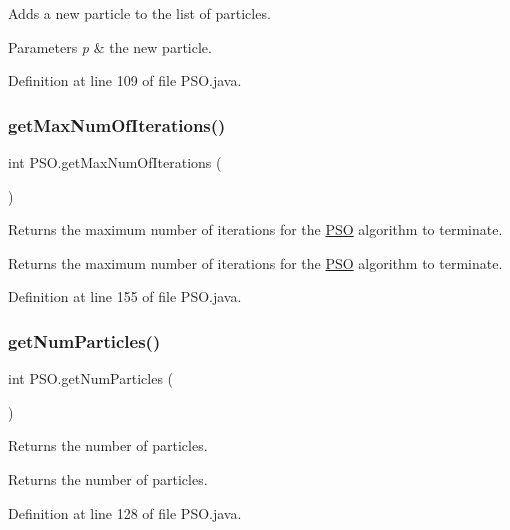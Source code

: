 Adds a new particle to the list of particles. 
\begin{DoxyParams}{Parameters}
{\em p} & the new particle. \\
\hline
\end{DoxyParams}


Definition at line 109 of file P\+S\+O.\+java.

\mbox{\label{class_p_s_o_a0d3cd48e829ba5ccb754e26f1890e51b}} 
\subsubsection{\texorpdfstring{get\+Max\+Num\+Of\+Iterations()}{getMaxNumOfIterations()}}
{\footnotesize\ttfamily int P\+S\+O.\+get\+Max\+Num\+Of\+Iterations (\begin{DoxyParamCaption}{ }\end{DoxyParamCaption})}

Returns the maximum number of iterations for the \hyperlink{class_p_s_o}{P\+SO} algorithm to terminate. \begin{DoxyReturn}{Returns}
the maximum number of iterations for the \hyperlink{class_p_s_o}{P\+SO} algorithm to terminate. 
\end{DoxyReturn}


Definition at line 155 of file P\+S\+O.\+java.

\mbox{\label{class_p_s_o_acc2a16aac995a30f3265fa06182509af}} 
\subsubsection{\texorpdfstring{get\+Num\+Particles()}{getNumParticles()}}
{\footnotesize\ttfamily int P\+S\+O.\+get\+Num\+Particles (\begin{DoxyParamCaption}{ }\end{DoxyParamCaption})}

Returns the number of particles. \begin{DoxyReturn}{Returns}
the number of particles. 
\end{DoxyReturn}


Definition at line 128 of file P\+S\+O.\+java.

